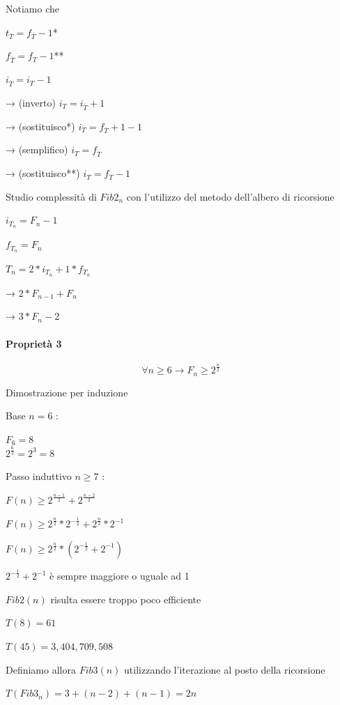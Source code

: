 \documentclass[11pt,a4paper,twoside,openright]{book}
\let\oldparagraph\paragraph
\renewcommand{\paragraph}[1]{\oldparagraph{#1}\mbox{}}
\begin{document}
{{{{Notiamo che }

$t_{\overline{T}} = f_{\overline{T}}-1${*}

$f_{\overline{T}} = f_{T}-1${**}

$i_{\overline{T}} = i_{T}-1$

{→ (inverto) $i_T=i_{\overline{T}}+1$}

{→ (sostituisco*) $i_T=f_{\overline{T}}+1-1$}

{→ (semplifico) $i_T=f_{\overline{T}}$}

{→ (sostituisco**) $i_T=f_T-1$}

{Studio complessità di $Fib2_n$ con l'utilizzo del metodo dell'albero di ricorsione}

$i_{T_n}=F_n-1$

$f_{T_n}=F_n$

$T_n = 2 * i_{T_n}+1*f_{T_n}$

{→ $2 * F_{n-1} + F_n$}

{→ $3 * F_n - 2$}

\paragraph{Proprietà 3}

\begin{equation}
\forall n \geq 6 \rightarrow F_n \geq 2^{\frac{n}{2}}
\end{equation}

{Dimostrazione per induzione}

{Base $n=6$ :}

$F_6=8$	\\
$2^{\frac{6}{3}}=2^3=8$

{Passo induttivo $n \geq 7$ :}

$F(n) \geq 2^{\frac{n-1}{2}} + 2^{\frac{n-2}{2}}$

$F(n) \geq 2^{\frac{n}{2}} * 2^{-\frac{1}{2}} + 2^{\frac{n}{2}} * 2^{-1} $

$F(n) \geq 2^{\frac{n}{2}} * ( 2^{-\frac{1}{2}} + 2^{-1} )$

{$2^{-\frac{1}{2}}+2^{-1}$ è sempre maggiore o uguale ad 1}

{$Fib2(n)$ risulta essere troppo poco efficiente}

$T(8)=61$

$T(45) = 3,404,709,508$

{Definiamo allora $Fib3(n)$ utilizzando l'iterazione al posto della ricorsione}



$T(Fib3_n)=3+(n-2)+(n-1)=2n$

}}}
\end{document}
